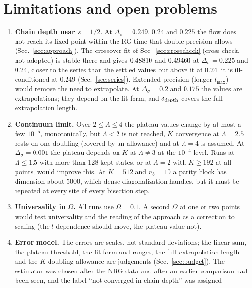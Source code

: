 \documentclass[10pt,a4paper]{article}
\newcommand{\Ds}{\Delta_\sigma}
\newcommand{\dd}{\delta_{\rm depth}}
\begin{document}
\section{Limitations and open problems}\label{sec:limits}
\begin{enumerate}
\item \textbf{Chain depth near $s=1/2$.} At $\Ds=0.249$, $0.24$ and $0.225$ the flow does not reach its fixed point within the RG time
  that double precision allows (Sec.~\ref{sec:approach}). The crossover fit of Sec.~\ref{sec:crosscheck} (cross-check, not adopted) is
  stable there and gives $0.48810$ and $0.49460$ at $\Ds=0.225$ and $0.24$, closer to the series than the
  settled values but above it at $0.24$; it is ill-conditioned at $0.249$ (Sec.~\ref{sec:series}). Extended precision (longer
  $l_{\max}$) would remove the need to extrapolate. At $\Ds=0.2$ and $0.175$ the values are extrapolations; they depend on the fit
  form, and $\dd$ covers the full extrapolation length.
\item \textbf{Continuum limit.} Over $2\le\Lambda\le4$ the plateau values change by at most a few $10^{-5}$, monotonically, but
  $\Lambda<2$ is not reached, $K$ convergence at $\Lambda=2.5$ rests on one doubling (covered by an allowance) and at $\Lambda=4$ is
  assumed. At $\Ds=0.001$ the plateau depends on $K$ at $\Lambda\neq3$ at the $10^{-4}$ level. Runs at $\Lambda\le1.5$ with more than
  128 kept states, or at $\Lambda=2$ with $K\ge192$ at all points, would improve this. At $K=512$ and $n_b=10$ a parity block has
  dimension about 5000, which dense diagonalization handles, but it must be repeated at every site of every bisection step.
\item \textbf{Universality in $\Omega$.} All runs use $\Omega=0.1$. A second $\Omega$ at one or two points would test universality and
  the reading of the approach as a correction to scaling (the $l$ dependence should move, the plateau value not).
\item \textbf{Error model.} The errors are scales, not standard deviations; the linear sum, the plateau threshold, the fit form and
  ranges, the full extrapolation length and the $K$-doubling allowance are judgements (Sec.~\ref{sec:budget}). The estimator was
  chosen after the NRG data and after an earlier comparison had been seen, and the label ``not converged in chain depth'' was assigned

\end{enumerate}
\end{document}
